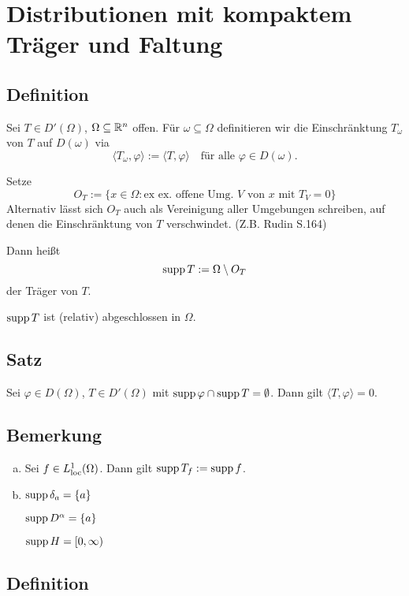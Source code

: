 \section{Distributionen mit kompaktem Träger und Faltung}

\subsection{Definition}

Sei $T \in D'(\Omega)$, $\Omega \subseteq \mathbb{R}^n$ offen. 
Für $\omega \subseteq  \Omega$ definitieren wir die Einschränktung $T_\omega$ von $T$ auf $D(\omega)$ via
$$
\langle T_\omega, \varphi \rangle := \langle T, \varphi \rangle \quad \text{für alle } \varphi \in D(\omega).
$$

Setze 
$$
O_T := \{ x \in \Omega \colon \text{ex ex. offene Umg. } V \text{ von } x \text{ mit } T_V = 0\}
$$
{\tiny{ Alternativ lässt sich $O_T$ auch als Vereinigung aller Umgebungen schreiben, auf denen die Einschränktung von $T$ verschwindet. (Z.B. Rudin S.164)}}

Dann heißt 
$$
\operatorname{supp} T := \Omega \setminus O_T
$$
der Träger von $T$.

\begin{bem}
  $\operatorname{supp} T$ ist (relativ) abgeschlossen in $\Omega$.
\end{bem}

\subsection{Satz}

Sei $\varphi \in D(\Omega)$, $T \in D'(\Omega)$ mit $\operatorname{supp} \varphi \cap \operatorname{supp} T = \emptyset$.
Dann gilt $\langle T, \varphi \rangle = 0$.

\subsection{Bemerkung}

\begin{enumerate}[a)]
  \item Sei $f \in L^1_{\operatorname{loc}}(\Omega)$.
    Dann gilt $\operatorname{supp} T_f := \operatorname{supp} f$.
  \item $\operatorname{supp} \delta_a = \{a\}$

    $\operatorname{supp} D^\alpha = \{a\}$

    $\operatorname{supp} H = [0,\infty)$
\end{enumerate}

\subsection{Definition}

